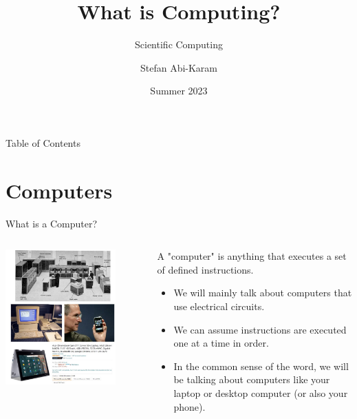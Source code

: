 \documentclass[aspectratio=169]{beamer}
\title{What is Computing?}
\subtitle{Scientific Computing}
\author{Stefan Abi-Karam}
\date{Summer 2023}
\begin{document}
\begin{frame}
    \titlepage
\end{frame}

\begin{frame}{Table of Contents}
    \tableofcontents
\end{frame}

\section{Computers}

\begin{frame}{What is a Computer?}

    \begin{columns}
        \begin{column}{0.5\textwidth}
            \includegraphics[width=0.8\textwidth]{imgs/vis_0.jpg}
        \end{column}
        \begin{column}{0.5\textwidth}
            A "computer" is anything that executes a set of defined instructions.

            \vspace{\baselineskip}

            \begin{itemize}
                \item We will mainly talk about computers that use electrical circuits.
                \item We can assume instructions are executed one at a time in order.
                \item In the common sense of the word, we will be talking about computers like your laptop or desktop computer (or also your phone).
            \end{itemize}
        \end{column}
    \end{columns}
\end{frame}
\end{document}

